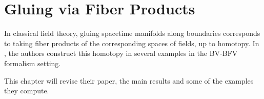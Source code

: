 \chapter{Gluing via Fiber Products}
\label{chap:gluing}

In classical field theory, gluing spacetime manifolds along boundaries corresponds to taking fiber products of the corresponding spaces of fields, up to homotopy.
In \cite{Gluing_BV-BFV}, the authors construct this homotopy in several examples in the BV-BFV formalism setting.

This chapter will revise their paper, the main results and some of the examples they compute.



